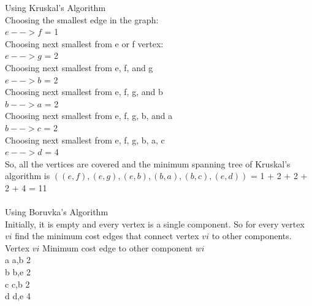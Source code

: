 \documentclass[12pt]{article}
\begin{document}
\begin{enumerate}
Using Kruskal's Algorithm \\
Choosing the smallest edge in the graph: \\
\hspace*{30mm} $e --> f$ = 1 \\
Choosing next smallest from e or f vertex: \\
\hspace*{30mm} $e --> g$ = 2 \\
Choosing next smallest from e, f, and g \\
\hspace*{30mm} $e --> b$ = 2 \\
Choosing next smallest from e, f, g, and b \\
\hspace*{30mm} $b --> a$ = 2 \\
Choosing next smallest from e, f, g, b, and a \\
\hspace*{30mm} $b --> c$ = 2 \\
Choosing next smallest from e, f, g, b, a, c\\
\hspace*{30mm} $e --> d$ = 4 \\
So, all the vertices are covered and the minimum spanning tree of Kruskal's algorithm is $((e,f), (e,g), (e,b), (b,a), (b,c),(e,d))$ = 1 + 2 + 2 + 2 + 4 = 11\\
\\Using Boruvka's Algorithm \\
Initially, it is empty and every vertex is a single component. So for every vertex $v{i}$ find the minimum cost edges that connect vertex $v{i}$ to other components. \\
Vertex $v{i}$ \hspace*{10mm} Minimum cost edge to other component \hspace*{10mm} $w{i}$  \\
a \hspace*{40mm} a,b \hspace*{60mm} 2 \\
b \hspace*{40mm} b,e \hspace*{60mm} 2 \\
c \hspace*{40mm} c,b \hspace*{60mm} 2 \\
d \hspace*{40mm} d,e \hspace*{60mm} 4 \\

\end{enumerate}
\end{document}
